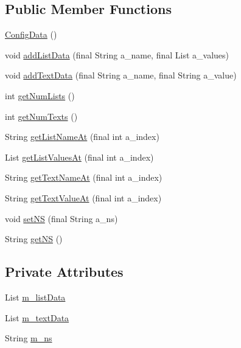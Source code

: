 \subsection*{Public Member Functions}
\begin{DoxyCompactItemize}
\item 
\hyperlink{classorg_1_1jgap_1_1data_1_1config_1_1_config_data_a71053f38e427626f430cfac18b8b5958}{Config\-Data} ()
\item 
void \hyperlink{classorg_1_1jgap_1_1data_1_1config_1_1_config_data_a33fe734116632db8d58475b45be345e9}{add\-List\-Data} (final String a\-\_\-name, final List a\-\_\-values)
\item 
void \hyperlink{classorg_1_1jgap_1_1data_1_1config_1_1_config_data_a8fb63cc158b392371047f838b86b5cd6}{add\-Text\-Data} (final String a\-\_\-name, final String a\-\_\-value)
\item 
int \hyperlink{classorg_1_1jgap_1_1data_1_1config_1_1_config_data_a8485a6945a0ea9c6c4c171f505e51add}{get\-Num\-Lists} ()
\item 
int \hyperlink{classorg_1_1jgap_1_1data_1_1config_1_1_config_data_a333beb0e0cf9f9de440fe52a179bded4}{get\-Num\-Texts} ()
\item 
String \hyperlink{classorg_1_1jgap_1_1data_1_1config_1_1_config_data_a70bde62ffb45a11a5cc014b0d03f5f22}{get\-List\-Name\-At} (final int a\-\_\-index)
\item 
List \hyperlink{classorg_1_1jgap_1_1data_1_1config_1_1_config_data_af6cc3222a28054b2e187eaa4706a3937}{get\-List\-Values\-At} (final int a\-\_\-index)
\item 
String \hyperlink{classorg_1_1jgap_1_1data_1_1config_1_1_config_data_a7249bd78f7dd39fda0f311d8aa49e8cd}{get\-Text\-Name\-At} (final int a\-\_\-index)
\item 
String \hyperlink{classorg_1_1jgap_1_1data_1_1config_1_1_config_data_a337c39131033d92fd4052382ff7230a1}{get\-Text\-Value\-At} (final int a\-\_\-index)
\item 
void \hyperlink{classorg_1_1jgap_1_1data_1_1config_1_1_config_data_a5681728a8851cee1bfeb2943a01e9ec7}{set\-N\-S} (final String a\-\_\-ns)
\item 
String \hyperlink{classorg_1_1jgap_1_1data_1_1config_1_1_config_data_a3013b4d8f0a87e99d5a87f0951bbacbf}{get\-N\-S} ()
\end{DoxyCompactItemize}
\subsection*{Private Attributes}
\begin{DoxyCompactItemize}
\item 
List \hyperlink{classorg_1_1jgap_1_1data_1_1config_1_1_config_data_a04b312becd5fd3cf9d4c98c115a4c612}{m\-\_\-list\-Data}
\item 
List \hyperlink{classorg_1_1jgap_1_1data_1_1config_1_1_config_data_a17a23726b5e741f23161b1b0f9ac4b31}{m\-\_\-text\-Data}
\item 
String \hyperlink{classorg_1_1jgap_1_1data_1_1config_1_1_config_data_a33e433fa589fbce2c640d00ae302f9da}{m\-\_\-ns}
\end{DoxyCompactItemize}
